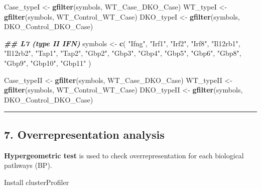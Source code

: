 \documentclass[
]{article}
\newenvironment{Shaded}{\begin{snugshade}}{\end{snugshade}}
\newcommand{\DocumentationTok}[1]{\textcolor[rgb]{0.56,0.35,0.01}{\textbf{\textit{#1}}}}
\newcommand{\FunctionTok}[1]{\textcolor[rgb]{0.13,0.29,0.53}{\textbf{#1}}}
\newcommand{\NormalTok}[1]{#1}
\newcommand{\OtherTok}[1]{\textcolor[rgb]{0.56,0.35,0.01}{#1}}
\newcommand{\StringTok}[1]{\textcolor[rgb]{0.31,0.60,0.02}{#1}}
\begin{document}
\begin{Shaded}
\begin{Highlighting}[]
\NormalTok{Case\_typeI }\OtherTok{\textless{}{-}} \FunctionTok{gfilter}\NormalTok{(symbols, WT\_Case\_DKO\_Case)}
\NormalTok{WT\_typeI }\OtherTok{\textless{}{-}} \FunctionTok{gfilter}\NormalTok{(symbols, WT\_Control\_WT\_Case)}
\NormalTok{DKO\_typeI }\OtherTok{\textless{}{-}} \FunctionTok{gfilter}\NormalTok{(symbols, DKO\_Control\_DKO\_Case)}


\DocumentationTok{\#\# L7 (type II IFN)}
\NormalTok{symbols }\OtherTok{\textless{}{-}} \FunctionTok{c}\NormalTok{(}
  \StringTok{"Ifng"}\NormalTok{, }\StringTok{"Irf1"}\NormalTok{, }\StringTok{"Irf2"}\NormalTok{, }\StringTok{"Irf8"}\NormalTok{, }\StringTok{"Il12rb1"}\NormalTok{, }\StringTok{"Il12rb2"}\NormalTok{, }\StringTok{"Tap1"}\NormalTok{, }\StringTok{"Tap2"}\NormalTok{, }\StringTok{"Gbp2"}\NormalTok{, }\StringTok{"Gbp3"}\NormalTok{, }\StringTok{"Gbp4"}\NormalTok{, }\StringTok{"Gbp5"}\NormalTok{, }\StringTok{"Gbp6"}\NormalTok{, }\StringTok{"Gbp8"}\NormalTok{, }\StringTok{"Gbp9"}\NormalTok{, }\StringTok{"Gbp10"}\NormalTok{, }\StringTok{"Gbp11"}
\NormalTok{)}

\NormalTok{Case\_typeII }\OtherTok{\textless{}{-}} \FunctionTok{gfilter}\NormalTok{(symbols, WT\_Case\_DKO\_Case)}
\NormalTok{WT\_typeII }\OtherTok{\textless{}{-}} \FunctionTok{gfilter}\NormalTok{(symbols, WT\_Control\_WT\_Case)}
\NormalTok{DKO\_typeII }\OtherTok{\textless{}{-}} \FunctionTok{gfilter}\NormalTok{(symbols, DKO\_Control\_DKO\_Case)}
\end{Highlighting}
\end{Shaded}

\begin{center}\rule{0.5\linewidth}{0.5pt}\end{center}

\subsection{7. Overrepresentation
analysis}\label{overrepresentation-analysis}

\textbf{Hypergeometric test} is used to check overrepresentation for
each biological pathways (BP).

Install clusterProfiler
\end{document}
